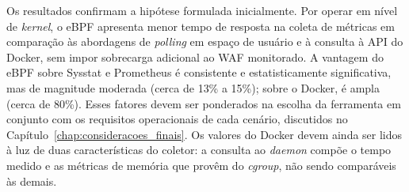 Os resultados confirmam a hipótese formulada inicialmente. Por operar em nível de \textit{kernel}, o eBPF apresenta menor tempo de resposta na coleta de métricas em comparação às abordagens de \textit{polling} em espaço de usuário e à consulta à API do Docker, sem impor sobrecarga adicional ao WAF monitorado. A vantagem do eBPF sobre Sysstat e Prometheus é consistente e estatisticamente significativa, mas de magnitude moderada (cerca de 13\% a 15\%); sobre o Docker, é ampla (cerca de 80\%). Esses fatores devem ser ponderados na escolha da ferramenta em conjunto com os requisitos operacionais de cada cenário, discutidos no Capítulo~\ref{chap:consideracoes_finais}. Os valores do Docker devem ainda ser lidos à luz de duas características do coletor: a consulta ao \textit{daemon} compõe o tempo medido e as métricas de memória que provêm do \textit{cgroup}, não sendo comparáveis às demais.
